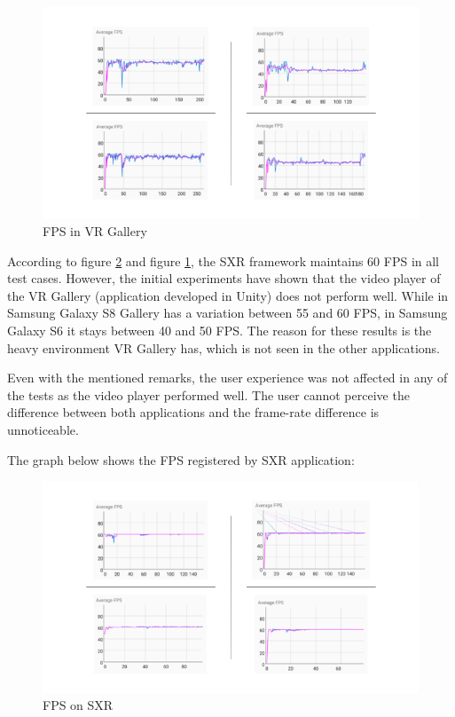\documentclass[runningheads]{llncs}
\begin{document}
\begin{figure}[h]
    \centering
    \includegraphics[width=\textwidth]{images/Gallery.png}
    \caption{FPS in VR Gallery}
    \label{gallery-graph}
\end{figure}

According to figure \ref{SXR-graph} and figure \ref{gallery-graph}, the SXR framework maintains 60 FPS in all test cases. However, the initial experiments have shown that the video player of the VR Gallery (application developed in Unity) does not perform well. While in Samsung Galaxy S8 Gallery has a variation between 55 and 60 FPS, in Samsung Galaxy S6 it stays between 40 and 50 FPS. The reason for these results is the heavy environment VR Gallery has, which is not seen in the other applications.

Even with the mentioned remarks, the user experience was not affected in any of the tests as the video player performed well. The user cannot perceive the difference between both applications and the frame-rate difference is unnoticeable.

The graph below shows the FPS registered by SXR application:

\begin{figure}[h]
    \centering
    \includegraphics[width=\textwidth]{images/SXR.png}
    \caption{FPS on SXR}
    \label{SXR-graph}
\end{figure}
\end{document}
